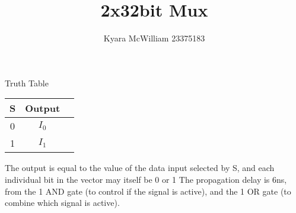 \documentclass{article}
\title{2x32bit Mux}
\author{Kyara McWilliam 23375183}
\date{}
\begin{document}
\maketitle

Truth Table

\begin{tabular}{ |c|c|c| }
\hline
S & Output \\
\hline
0 & $I_0$ \\
1 & $I_1$ \\
\hline
\end{tabular}

\hfill \break

The output is equal to the value of the data input selected by S, and each individual bit in the vector may itself be 0 or 1 \newline
The propagation delay is 6ns, from the 1 AND gate (to control if the signal is active), and the 1 OR gate (to combine which signal is active).
\end{document}
